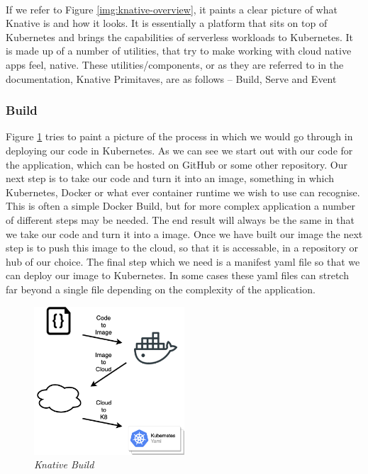\\If we refer to Figure \ref{img:knative-overview}, it paints a clear picture of what Knative is and how it looks. It is essentially a platform that sits on top of Kubernetes and brings the capabilities  of serverless workloads to Kubernetes. It is made up of a number of utilities, that try to make working with cloud native apps feel, native. These utilities/components, or as they are referred to in the documentation, Knative Primitaves, are as follows -- Build, Serve and Event

\subsubsection{Build}
Figure \ref{img:knative-build} tries to paint a picture of the process in which we would go through in deploying our code in Kubernetes. As we can see we start out with our code for the application, which can be hosted on GitHub or some other repository. Our next step is to take our code and turn it into an image, something in which Kubernetes, Docker or what ever container runtime we wish to use can recognise. This is often a simple Docker Build, but for more complex application a number of different steps may be needed. The end result will always be the same in that we take our code and turn it into a image. Once we have built our image the next step is to push this image to the cloud, so that it is accessable, in a repository or hub of our choice. The final step which we need is a manifest yaml file so that we can deploy our image to Kubernetes. In some cases these yaml files can stretch far beyond a single file depending on the complexity of the application.
\begin{figure}[!ht]
\centering
\includegraphics*[width=0.5\textwidth]{images/knative-build.png}
\caption{\em Knative Build}
\label{img:knative-build}
\end{figure}
